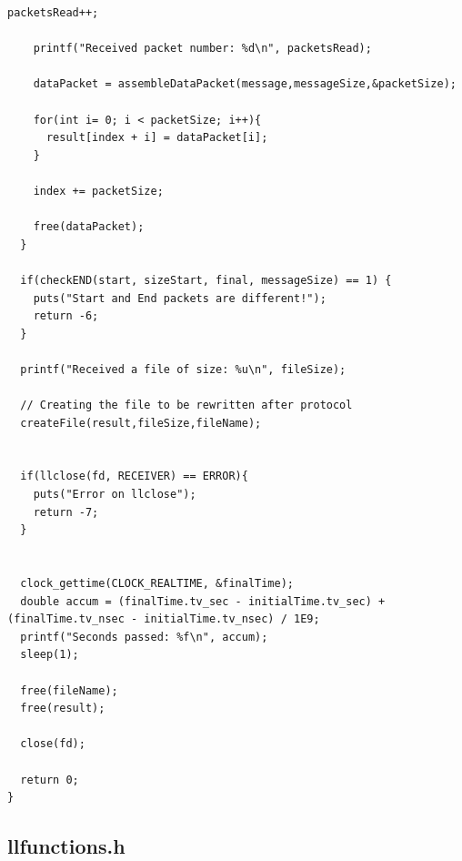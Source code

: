 \documentclass[11pt]{article}
\begin{document}
\begin{lstlisting}[style=CStyle]
    packetsRead++;
    
    printf("Received packet number: %d\n", packetsRead);

    dataPacket = assembleDataPacket(message,messageSize,&packetSize);

    for(int i= 0; i < packetSize; i++){
      result[index + i] = dataPacket[i];
    }

    index += packetSize;

    free(dataPacket);
  }
  
  if(checkEND(start, sizeStart, final, messageSize) == 1) {
    puts("Start and End packets are different!");
    return -6;
  }

  printf("Received a file of size: %u\n", fileSize);

  // Creating the file to be rewritten after protocol
  createFile(result,fileSize,fileName);


  if(llclose(fd, RECEIVER) == ERROR){
    puts("Error on llclose");
    return -7;
  }


  clock_gettime(CLOCK_REALTIME, &finalTime);
  double accum = (finalTime.tv_sec - initialTime.tv_sec) + (finalTime.tv_nsec - initialTime.tv_nsec) / 1E9;
  printf("Seconds passed: %f\n", accum);
  sleep(1);

  free(fileName);
  free(result);

  close(fd);

  return 0;
}
\end{lstlisting}

\pagebreak

\subsection{llfunctions.h}
\end{document}
